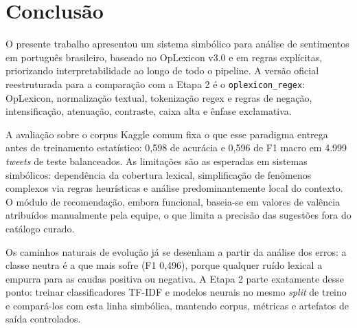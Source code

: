 \documentclass[11pt,a4paper]{article}
\newenvironment{addedblock}{\par\color{newblue}}{\par\color{black}}
\begin{document}
\begin{addedblock}
\section{Conclusão}
\label{sec:conclusao}

O presente trabalho apresentou um sistema simbólico para análise de sentimentos em português brasileiro, baseado no OpLexicon v3.0 e em regras explícitas, priorizando interpretabilidade ao longo de todo o pipeline. A versão oficial reestruturada para a comparação com a Etapa 2 é o \texttt{oplexicon\_regex}: OpLexicon, normalização textual, tokenização regex e regras de negação, intensificação, atenuação, contraste, caixa alta e ênfase exclamativa.

A avaliação sobre o corpus Kaggle comum fixa o que esse paradigma entrega antes de treinamento estatístico: 0,598 de acurácia e 0,596 de F1 macro em 4.999 \emph{tweets} de teste balanceados. As limitações são as esperadas em sistemas simbólicos: dependência da cobertura lexical, simplificação de fenômenos complexos via regras heurísticas e análise predominantemente local do contexto. O módulo de recomendação, embora funcional, baseia-se em valores de valência atribuídos manualmente pela equipe, o que limita a precisão das sugestões fora do catálogo curado.

Os caminhos naturais de evolução já se desenham a partir da análise dos erros: a classe neutra é a que mais sofre (F1 0,496), porque qualquer ruído lexical a empurra para as caudas positiva ou negativa. A Etapa 2 parte exatamente desse ponto: treinar classificadores TF-IDF e modelos neurais no mesmo \emph{split} de treino e compará-los com esta linha simbólica, mantendo corpus, métricas e artefatos de saída controlados.
\end{addedblock}



\end{document}

